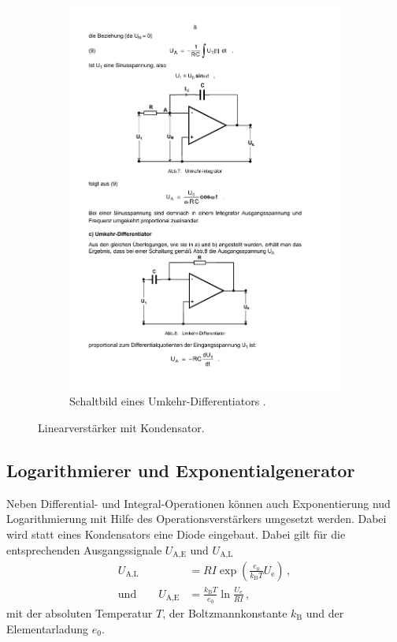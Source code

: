 \begin{figure}
\begin{subfigure}{.49\linewidth}
        \includegraphics[width=1.0\linewidth]{img/differentiator.pdf}
        \caption{Schaltbild eines Umkehr-Differentiators \cite{V51}.}
        \label{fig:integrator-differentiator}
    \end{subfigure}
    \caption{Linearverstärker mit Kondensator.}
    \label{fig:integrator}
\end{figure}

\subsection{Logarithmierer und Exponentialgenerator}
\label{subsec:log_expo}
Neben Differential- und Integral-Operationen können auch Exponentierung nud
Logarithmierung mit Hilfe des Operationsverstärkers umgesetzt werden.
Dabei wird statt eines Kondensators eine Diode eingebaut.
Dabei gilt für die entsprechenden Ausgangssignale $U_\text{A,E}$ und 
$U_\text{A,L}$
\begin{align*}
    U_\text{A,L} &= R I \exp\left(\frac{e_0}{k_\text{B}T} U_\text{e}\right)\,,\\
    \text{und} \qquad U_\text{A,E} &= \frac{k_\text{B}T}{e_0}\ln \frac{U_\text{e}}{R I}\,,
\end{align*}
mit der absoluten Temperatur $T$, der Boltzmannkonstante $k_\text{B}$ und
der Elementarladung $e_0$.

